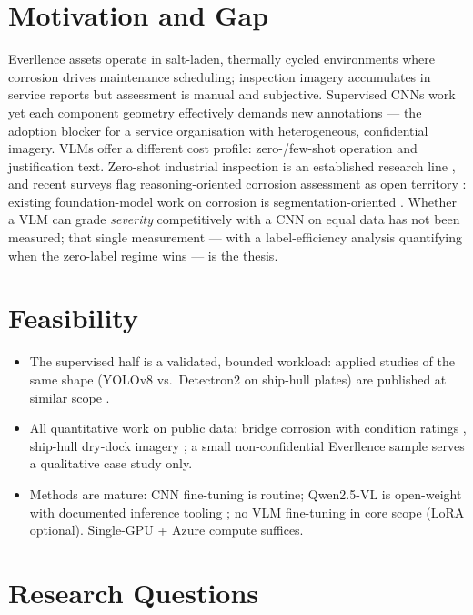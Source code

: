 \documentclass[10pt,a4paper]{article}
\begin{document}
\section{Motivation and Gap}

Everllence assets operate in salt-laden, thermally cycled environments where corrosion drives maintenance scheduling; inspection imagery accumulates in service reports but assessment is manual and subjective. Supervised CNNs work \cite{shiptech2024, atha2018} yet each component geometry effectively demands new annotations --- the adoption blocker for a service organisation with heterogeneous, confidential imagery. VLMs offer a different cost profile: zero-/few-shot operation and justification text. Zero-shot industrial inspection is an established research line \cite{jeong2023winclip, gu2024anomalygpt}, and recent surveys flag reasoning-oriented corrosion assessment as open territory \cite{yao2025survey}: existing foundation-model work on corrosion is segmentation-oriented \cite{chai2024corrosionsam}. Whether a VLM can grade \emph{severity} competitively with a CNN on equal data has not been measured; that single measurement --- with a label-efficiency analysis quantifying when the zero-label regime wins --- is the thesis.

\section{Feasibility}

\begin{itemize}
    \item The supervised half is a validated, bounded workload: applied studies of the same shape (YOLOv8 vs.\ Detectron2 on ship-hull plates) are published at similar scope \cite{shiptech2024}.
    \item All quantitative work on public data: bridge corrosion with condition ratings \cite{ameli2023bridge}, ship-hull dry-dock imagery \cite{chliveros2021mavecodd}; a small non-confidential Everllence sample serves a qualitative case study only.
    \item Methods are mature: CNN fine-tuning is routine; Qwen2.5-VL is open-weight with documented inference tooling \cite{bai2025qwen25vl}; no VLM fine-tuning in core scope (LoRA optional). Single-GPU + Azure compute suffices.
\end{itemize}

\section{Research Questions}
\end{document}

